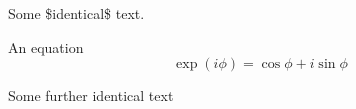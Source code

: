 \documentclass{article}
\begin{document}
Some \$identical\$ text.

An equation
\begin{equation*}
\exp(i\phi)=\cos \phi + i \sin \phi
\end{equation*}

Some further identical text
\end{document}
